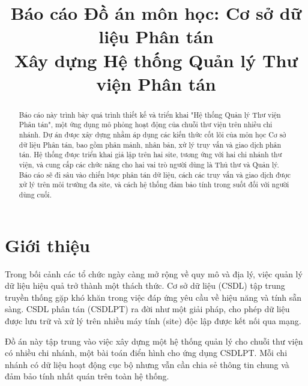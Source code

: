 \documentclass[conference]{IEEEtran}
\begin{document}
\title{Báo cáo Đồ án môn học: Cơ sở dữ liệu Phân tán \\ Xây dựng Hệ thống Quản lý Thư viện Phân tán}


\author{
}

\maketitle

\begin{abstract}
Báo cáo này trình bày quá trình thiết kế và triển khai "Hệ thống Quản lý Thư viện Phân tán", một ứng dụng mô phỏng hoạt động của chuỗi thư viện trên nhiều chi nhánh. Dự án được xây dựng nhằm áp dụng các kiến thức cốt lõi của môn học Cơ sở dữ liệu Phân tán, bao gồm phân mảnh, nhân bản, xử lý truy vấn và giao dịch phân tán. Hệ thống được triển khai giả lập trên hai site, tương ứng với hai chi nhánh thư viện, và cung cấp các chức năng cho hai vai trò người dùng là Thủ thư và Quản lý. Báo cáo sẽ đi sâu vào chiến lược phân tán dữ liệu, cách các truy vấn và giao dịch được xử lý trên môi trường đa site, và cách hệ thống đảm bảo tính trong suốt đối với người dùng cuối.
\end{abstract}

\section{Giới thiệu}
Trong bối cảnh các tổ chức ngày càng mở rộng về quy mô và địa lý, việc quản lý dữ liệu hiệu quả trở thành một thách thức. Cơ sở dữ liệu (CSDL) tập trung truyền thống gặp khó khăn trong việc đáp ứng yêu cầu về hiệu năng và tính sẵn sàng. CSDL phân tán (CSDLPT) ra đời như một giải pháp, cho phép dữ liệu được lưu trữ và xử lý trên nhiều máy tính (site) độc lập được kết nối qua mạng.

Đồ án này tập trung vào việc xây dựng một hệ thống quản lý cho chuỗi thư viện có nhiều chi nhánh, một bài toán điển hình cho ứng dụng CSDLPT. Mỗi chi nhánh có dữ liệu hoạt động cục bộ nhưng vẫn cần chia sẻ thông tin chung và đảm bảo tính nhất quán trên toàn hệ thống.
\end{document}
